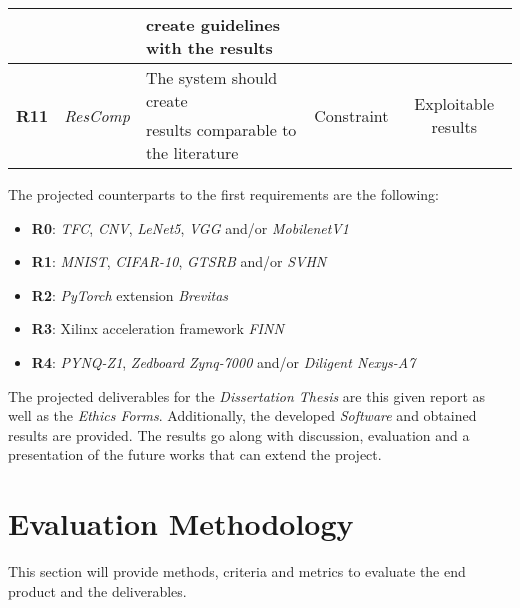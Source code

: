 {\begin{tabular}{| c c l c c |}
                              &                                         & create guidelines with the results                                     &                             & \\ \hline
\multirow{2}{*}{\textbf{R11}} & \multirow{2}{*}{\emph{ResComp}}         & The system should create                                               & \multirow{2}{*}{Constraint} & \multirow{2}{*}{Exploitable results}\\
                              &                                         & results comparable to the literature                                   &                             & \\ \hline
\end{tabular}
}

The projected counterparts to the first requirements are the following:
\begin{itemize}
  \item \textbf{R0}: \emph{TFC}, \emph{CNV}, \emph{LeNet5}, \emph{VGG} and/or \emph{MobilenetV1}
  \item \textbf{R1}: \emph{MNIST}, \emph{CIFAR-10}, \emph{GTSRB} and/or \emph{SVHN}
  \item \textbf{R2}: \emph{PyTorch} extension \emph{Brevitas}
  \item \textbf{R3}: Xilinx acceleration framework \emph{FINN}
  \item \textbf{R4}: \emph{PYNQ-Z1}, \emph{Zedboard Zynq-7000} and/or \emph{Diligent Nexys-A7}
\end{itemize}

The projected deliverables for the \emph{Dissertation Thesis} are this given report as well as the \emph{Ethics Forms}. Additionally, the developed \emph{Software} and obtained results are provided. The results go along with discussion, evaluation and a presentation of the future works that can extend the project.


\section{Evaluation Methodology}

This section will provide methods, criteria and metrics to evaluate the end product and the deliverables.

